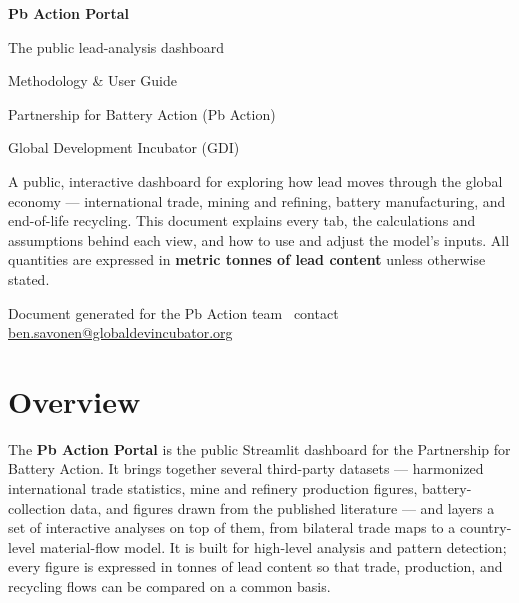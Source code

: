 \documentclass[11pt,a4paper]{article}
\begin{document}
\begin{titlepage}
\centering
\vspace*{2cm}
{\color{pbblue}\Huge\bfseries Pb Action Portal\par}
\vspace{0.4cm}
{\Large The public lead-analysis dashboard\par}
\vspace{0.3cm}
{\large\color{pbgrey} Methodology \& User Guide\par}
\vspace{1.5cm}
{\large Partnership for Battery Action (Pb Action)\par}
{\normalsize Global Development Incubator (GDI)\par}
\vspace{2cm}
\begin{minipage}{0.8\textwidth}
\centering\small\color{pbgrey}
A public, interactive dashboard for exploring how lead moves through the global
economy --- international trade, mining and refining, battery manufacturing, and
end-of-life recycling. This document explains every tab, the calculations and
assumptions behind each view, and how to use and adjust the model's inputs. All
quantities are expressed in \textbf{metric tonnes of lead content} unless
otherwise stated.
\end{minipage}
\vfill
{\small\color{pbgrey} Document generated for the Pb Action team \textbullet\ contact
\href{mailto:ben.savonen@globaldevincubator.org}{ben.savonen@globaldevincubator.org}\par}
\end{titlepage}

\tableofcontents
\clearpage

\section{Overview}

The \textbf{Pb Action Portal} is the public Streamlit dashboard for the
Partnership for Battery Action. It brings together several third-party datasets ---
harmonized international trade statistics, mine and refinery production figures,
battery-collection data, and figures drawn from the published literature --- and
layers a set of interactive analyses on top of them, from bilateral trade maps to
a country-level material-flow model. It is built for high-level analysis and
pattern detection; every figure is expressed in tonnes of lead content so that
trade, production, and recycling flows can be compared on a common basis.
\end{document}
